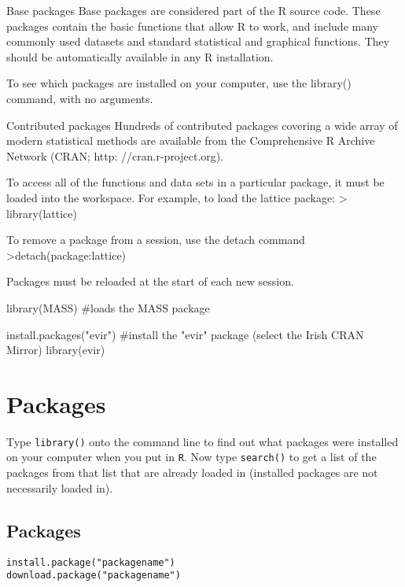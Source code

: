  
 
 
 Base packages
 Base packages are considered part of the R source code. These packages contain the basic functions that allow R to work, and include many commonly used datasets and standard statistical and graphical functions. They should be automatically available in any R installation.
 
 
 To see which packages are installed on your computer, use the library() command, with no arguments.
 
 Contributed packages
 Hundreds of contributed packages covering a wide array of modern statistical methods are available from the Comprehensive R Archive Network (CRAN; http: //cran.r-project.org).
 
 To access all of the functions and data sets in a particular package, it must be loaded into the workspace. 
 For example, to load the lattice package:
 > library(lattice)
 
 To remove a package from a session, use the detach command
 >detach(package:lattice)
 
 Packages must be reloaded at the start of each new session.
 
 
 library(MASS)							  #loads the MASS package
 
 install.packages("evir")			#install the "evir" package (select the Irish CRAN Mirror)
 library(evir)
 
 
\section{Packages}

Type \texttt{library()} onto the command line to find out what packages were installed on your computer
when you put in \texttt{R}. Now type \texttt{search()} to get a list of the packages from that list that are
already loaded in (installed packages are not necessarily loaded in). 



\subsection{Packages}

\begin{verbatim}
install.package("packagename")
download.package("packagename")
\end{verbatim}

